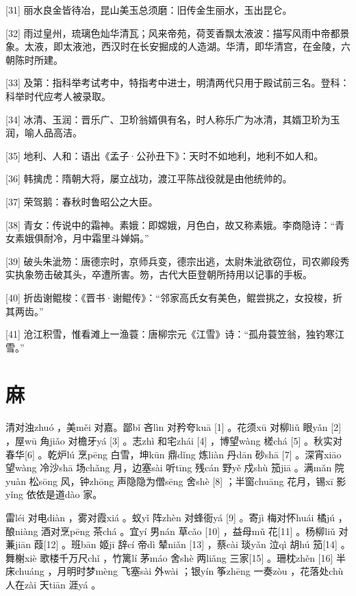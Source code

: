 \documentclass[12pt,UTF8]{ctexbook}
\begin{document}
[31] 丽水良金皆待冶，昆山美玉总须磨：旧传金生丽水，玉出昆仑。

[32] 雨过皇州，琉璃色灿华清瓦；风来帝苑，荷芰香飘太液波：描写风雨中帝都景象。太液，即太液池，西汉时在长安掘成的人造湖。华清，即华清宫，在金陵，六朝陈时所建。

[33] 及第：指科举考试考中，特指考中进士，明清两代只用于殿试前三名。登科：科举时代应考人被录取。

[34] 冰清、玉润：晋乐广、卫玠翁婿俱有名，时人称乐广为冰清，其婿卫玠为玉润，喻人品高洁。

[35] 地利、人和：语出《孟子·公孙丑下》：天时不如地利，地利不如人和。

[36] 韩擒虎：隋朝大将，屡立战功，渡江平陈战役就是由他统帅的。

[37] 荣驾鹅：春秋时鲁昭公之大臣。

[38] 青女：传说中的霜神。素娥：即嫦娥，月色白，故又称素娥。李商隐诗：“青女素娥俱耐冷，月中霜里斗婵娟。”

[39] 破头朱泚笏：唐德宗时，京师兵变，德宗出逃，太尉朱泚欲窃位，司农卿段秀实执象笏击破其头，卒遭所害。笏，古代大臣登朝所持用以记事的手板。

[40] 折齿谢鲲梭：《晋书·谢鲲传》：“邻家高氏女有美色，鲲尝挑之，女投梭，折其两齿。”

[41] 沧江积雪，惟看滩上一渔蓑：唐柳宗元《江雪》诗：“孤舟蓑笠翁，独钓寒江雪。”





\chapter{麻}


清对浊zhuó ，美měi 对嘉。鄙bǐ 吝lìn 对矜夸kuā [1] 。花须xū 对柳liǔ 眼yǎn [2] ，屋wū 角jiǎo 对檐牙yá [3] 。志zhì 和宅zhái [4] ，博望wàng 槎chá [5] 。秋实对春华[6] 。乾炉lú 烹pēng 白雪，坤kūn 鼎dǐng 炼liàn 丹dān 砂shā [7] 。深宵xiāo 望wàng 冷沙shā 场chǎng 月，边塞sài 听tīng 残cán 野yě 戍shù 笳jiā 。满mǎn 院yuàn 松sōng 风，钟zhōng 声隐隐为僧sēng 舍shè [8] ；半窗chuāng 花月，锡xī 影yǐng 依依是道dào 家。

雷léi 对电diàn ，雾对霞xiá 。蚁yǐ 阵zhèn 对蜂衙yá [9] 。寄jì 梅对怀huái 橘jú ，酿niàng 酒对烹pēng 茶chá 。宜yí 男nán 草cǎo [10] ，益母mǔ 花[11] 。杨柳liǔ 对蒹jiān 葭[12] 。班bān 姬jī 辞cí 帝dì 辇niǎn [13] ，蔡cài 琰yǎn 泣qì 胡hú 笳[14] 。舞榭xiè 歌楼千万尺chǐ ，竹篱lí 茅máo 舍shè 两liǎng 三家[15] 。珊枕zhěn [16] 半床chuáng ，月明时梦mèng 飞塞sài 外wài ；银yín 筝zhēng 一奏zòu ，花落处chù 人在zài 天tiān 涯yá 。
\end{document}
